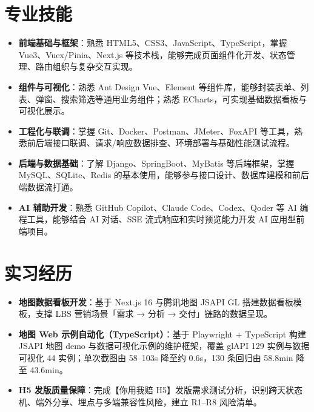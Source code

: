 \documentclass[10pt]{article}
\begin{document}
    \ResumeContactBar
    \ResumeProfileAndEducation



    \section[专业技能]{\makebox[\iconwidth][c]{\color{primarycolor}{\faWrench}}\quad 专业技能}
    \begin{itemize}
        \item \textbf{前端基础与框架}：熟悉 HTML5、CSS3、JavaScript、TypeScript，掌握 Vue3、Vuex/Pinia、Next.js 等技术栈，能够完成页面组件化开发、状态管理、路由组织与复杂交互实现。
        \item \textbf{组件与可视化}：熟悉 Ant Design Vue、Element 等组件库，能够封装表单、列表、弹窗、搜索筛选等通用业务组件；熟悉 ECharts，可实现基础数据看板与可视化展示。
        \item \textbf{工程化与联调}：掌握 Git、Docker、Postman、JMeter、FoxAPI 等工具，熟悉前后端接口联调、请求/响应数据排查、环境部署与基础性能测试流程。
        \item \textbf{后端与数据基础}：了解 Django、SpringBoot、MyBatis 等后端框架，掌握 MySQL、SQLite、Redis 的基本使用，能够参与接口设计、数据库建模和前后端数据流打通。
        \item \textbf{AI 辅助开发}：熟悉 GitHub Copilot、Claude Code、Codex、Qoder 等 AI 编程工具，能够结合 AI 对话、SSE 流式响应和实时预览能力开发 AI 应用型前端项目。
    \end{itemize}



    \section[实习经历]{\makebox[\iconwidth][c]{\color{primarycolor}{\faBriefcase}}\quad 实习经历}

    \begin{itemize}
        \item \textbf{地图数据看板开发}：基于 Next.js 16 与腾讯地图 JSAPI GL 搭建数据看板模板，支撑 LBS 营销场景「需求 → 分析 → 交付」链路的数据呈现。
        \item \textbf{地图 Web 示例自动化（TypeScript）}：基于 Playwright + TypeScript 构建 JSAPI 地图 demo 与数据可视化示例的维护框架，覆盖 glAPI 129 实例与数据可视化 44 实例；单次截图由 58--103s 降至约 0.6s，130 条回归由 58.8min 降至 43.6min。
        \item \textbf{H5 发版质量保障}：完成【你用我赔 H5】发版需求测试分析，识别跨天状态机、端外分享、埋点与多端兼容性风险，建立 R1--R8 风险清单。
    \end{itemize}
\end{document}
